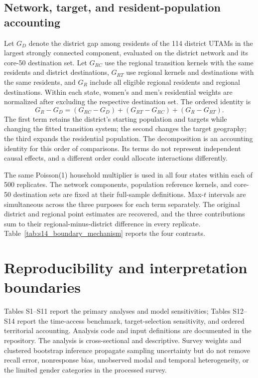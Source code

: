 \documentclass[11pt]{article}
\begin{document}


\subsection{Network, target, and resident-population accounting}
Let $G_D$ denote the district gap among residents of the 114 district UTAMs in the
largest strongly connected component, evaluated on the district network and its
core-50 destination set. Let $G_{RC}$ use the regional transition kernels with the
same residents and district destinations, $G_{RT}$ use regional kernels and
destinations with the same residents, and $G_R$ include all eligible regional
residents and regional destinations. Within each state, women's and men's
residential weights are normalized after excluding the respective destination set.
The ordered identity is
\begin{equation}
G_R-G_D=(G_{RC}-G_D)+(G_{RT}-G_{RC})+(G_R-G_{RT}).
\end{equation}
The first term retains the district's starting population and targets while
changing the fitted transition system; the second changes the target geography;
the third expands the residential population. The decomposition is an accounting
identity for this order of comparisons. Its terms do not represent independent
causal effects, and a different order could allocate interactions differently.

The same Poisson(1) household multiplier is used in all four states within each
of 500 replicates. The network components, population reference kernels, and
core-50 destination sets are fixed at their full-sample definitions. Max-$t$
intervals are simultaneous across the three purposes for each term separately.
The original district and regional point estimates are recovered, and the three
contributions sum to their regional-minus-district difference in every replicate.
Table~\ref{tab:s14_boundary_mechanism} reports the four contrasts.



\section{Reproducibility and interpretation boundaries}
Tables S1--S11 report the primary analyses and model sensitivities; Tables S12--S14
report the time-access benchmark, target-selection sensitivity, and ordered
territorial accounting. Analysis code and input definitions are documented in
the repository. The analysis is cross-sectional and descriptive. Survey
weights and clustered bootstrap inference propagate sampling uncertainty but do not
remove recall error, nonresponse bias, unobserved modal and temporal heterogeneity, or
the limited gender categories in the processed survey.
\end{document}
